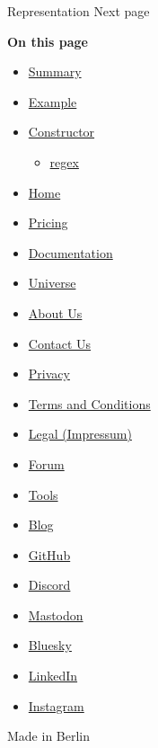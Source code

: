 \href{/docs/reference/foundations/repr/}{\pandocbounded{}}

{ Representation } { Next page }

\textbf{On this page}

\begin{itemize}
\tightlist
\item
  \hyperref[summary]{Summary}
\item
  \hyperref[example]{Example}
\item
  \hyperref[constructor]{Constructor}

  \begin{itemize}
  \tightlist
  \item
    \hyperref[constructor-regex]{regex}
  \end{itemize}
\end{itemize}

\begin{itemize}
\tightlist
\item
  \href{/}{Home}
\item
  \href{/pricing/}{Pricing}
\item
  \href{/docs/}{Documentation}
\item
  \href{/universe/}{Universe}
\item
  \href{/about/}{About Us}
\item
  \href{/contact/}{Contact Us}
\item
  \href{/privacy/}{Privacy}
\item
  \href{https://typst.app/terms}{Terms and Conditions}
\item
  \href{/legal/}{Legal (Impressum)}
\end{itemize}

\begin{itemize}
\tightlist
\item
  \href{https://forum.typst.app}{Forum}
\item
  \href{/tools/}{Tools}
\item
  \href{/blog/}{Blog}
\item
  \href{https://github.com/typst/}{GitHub}
\item
  \href{https://discord.gg/2uDybryKPe}{Discord}
\item
  \href{https://mastodon.social/@typst}{Mastodon}
\item
  \href{https://bsky.app/profile/typst.app}{Bluesky}
\item
  \href{https://www.linkedin.com/company/typst/}{LinkedIn}
\item
  \href{https://instagram.com/typstapp/}{Instagram}
\end{itemize}

Made in Berlin
